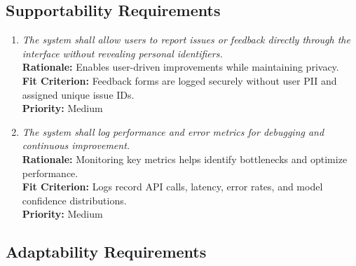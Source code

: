 \documentclass[12pt]{article}
\begin{document}
\subsection{Supportability Requirements}

\begin{enumerate}[label=MS-SUP\arabic*., wide=0pt, leftmargin=*]
  \item \emph{The system shall allow users to report issues or
      feedback directly through the interface without revealing
    personal identifiers.}\\[2mm]
    {\bf Rationale:} Enables user-driven improvements while
    maintaining privacy.\\
    {\bf Fit Criterion:} Feedback forms are logged securely without
    user PII and assigned unique issue IDs.\\
    {\bf Priority:} Medium

  \item \emph{The system shall log performance and error metrics for
    debugging and continuous improvement.}\\[2mm]
    {\bf Rationale:} Monitoring key metrics helps identify
    bottlenecks and optimize performance.\\
    {\bf Fit Criterion:} Logs record API calls, latency, error rates,
    and model confidence distributions.\\
    {\bf Priority:} Medium
\end{enumerate}

\subsection{Adaptability Requirements}
\end{document}
